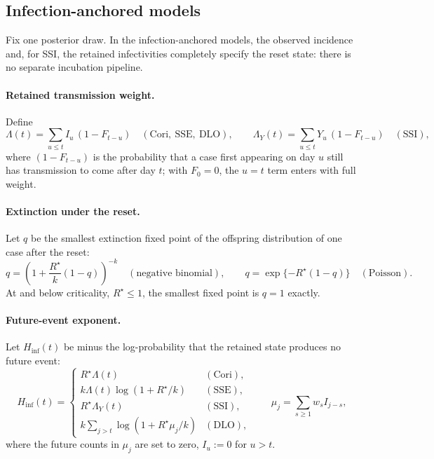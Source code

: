 \documentclass[11pt,a4paper]{article}
\theoremstyle{plain}
\theoremstyle{definition}
\newcommand{\Rreset}{R^{\star}}
\newcommand{\dlo}{DLO}
\newcommand{\sse}{SSE}
\newcommand{\ssi}{SSI}
\newcommand{\cori}{Cori}
\begin{document}
\subsection{Infection-anchored models}
\label{sec:naive-risk}

Fix one posterior draw. In the infection-anchored models, the observed incidence and, for
\ssi{}, the retained infectivities completely specify the reset state: there is no separate
incubation pipeline.

\paragraph{Retained transmission weight.} Define
\begin{equation}
  \Lambda(t) = \sum_{u\le t} I_u\,(1-F_{t-u})
  \quad (\text{\cori{}},\ \text{\sse{}},\ \text{\dlo{}}),
  \qquad
  \Lambda_Y(t) = \sum_{u\le t} Y_u\,(1-F_{t-u})
  \quad (\text{\ssi{}}),
  \label{eq:pooled-weight}
\end{equation}
where $(1-F_{t-u})$ is the probability that a case first appearing on day $u$ still has
transmission to come after day $t$; with $F_0 = 0$, the $u=t$ term enters with full weight.

\paragraph{Extinction under the reset.} Let $q$ be the smallest extinction fixed point of the
offspring distribution of one case after the reset:
\begin{equation}
  q = \left(1+\frac{\Rreset}{k}(1-q)\right)^{-k}
  \quad (\text{negative binomial}),
  \qquad
  q = \exp\{-\Rreset(1-q)\}
  \quad (\text{Poisson}).
  \label{eq:extinction-root}
\end{equation}
At and below criticality, $\Rreset\leq1$, the smallest fixed point is $q=1$ exactly.

\paragraph{Future-event exponent.} Let $H_{\mathrm{inf}}(t)$ be minus the log-probability that the
retained state produces no future event:
\begin{equation}
  H_{\mathrm{inf}}(t) =
  \begin{cases}
    \Rreset\Lambda(t) & (\text{\cori{}}),\\
    k\Lambda(t)\log(1+\Rreset/k) & (\text{\sse{}}),\\
    \Rreset\Lambda_Y(t) & (\text{\ssi{}}),\\
    k\displaystyle\sum_{j>t}\log(1+\Rreset\mu_j/k) & (\text{\dlo{}}),
  \end{cases}
  \qquad
  \mu_j = \sum_{s\ge1}w_s I_{j-s},
  \label{eq:infection-exponent}
\end{equation}
where the future counts in $\mu_j$ are set to zero, $I_u:=0$ for $u>t$.
\end{document}

